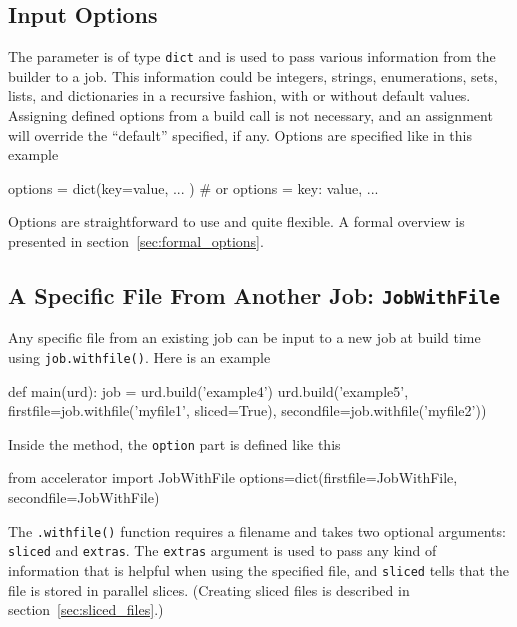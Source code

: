 \subsection{Input Options}

The \options parameter is of type \texttt{dict} and is used to pass
various information from the builder to a job.  This information could
be integers, strings, enumerations, sets, lists, and dictionaries in a
recursive fashion, with or without default values.  Assigning defined
options from a build call is not necessary, and an assignment will
override the ``default'' specified, if any.  Options are specified
like in this example
\begin{python}
  options = dict(key=value, ... )  # or
  options = {key: value, ...}
\end{python}

Options are straightforward to use and quite flexible.  A formal
overview is presented in section~\ref{sec:formal_options}.



\subsection{A Specific File From Another Job:  \texttt{JobWithFile}}
\label{sec:jobwithfile}
Any specific file from an existing job can be input to a new job at
build time using \texttt{job.withfile()}.  Here is an example
\begin{python}
def main(urd):
    job = urd.build('example4')
    urd.build('example5',
              firstfile=job.withfile('myfile1', sliced=True),
              secondfile=job.withfile('myfile2'))
\end{python}
Inside the method, the \texttt{option} part is defined like this
\begin{python}
from accelerator import JobWithFile
options=dict(firstfile=JobWithFile, secondfile=JobWithFile)
\end{python}
The \texttt{.withfile()} function requires a filename and takes two
optional arguments: \texttt{sliced} and \texttt{extras}.  The
\texttt{extras} argument is used to pass any kind of information that
is helpful when using the specified file, and \texttt{sliced} tells
that the file is stored in parallel slices.  (Creating sliced files is
described in section~\ref{sec:sliced_files}.)


